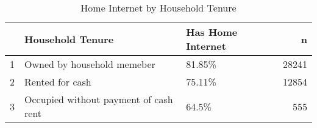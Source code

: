 \begin{table}[ht]
\centering
\begin{tabular}{rllr}
  \hline
 & Household Tenure & Has Home Internet & n \\ 
  \hline
1 & Owned by household memeber & 81.85\% & 28241 \\ 
  2 & Rented for cash & 75.11\% & 12854 \\ 
  3 & Occupied without payment of cash rent & 64.5\% & 555 \\ 
   \hline
\end{tabular}
\caption{Home Internet by Household Tenure} 
\end{table}

